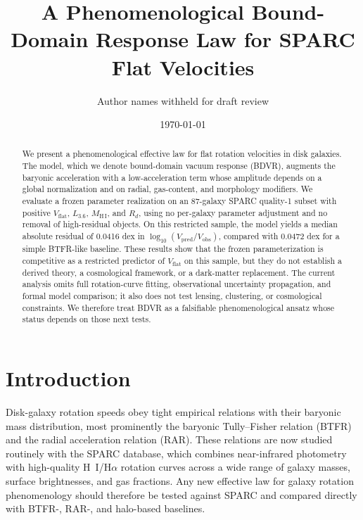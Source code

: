 \documentclass[aps,prd,preprint,nofootinbib,superscriptaddress]{revtex4-2}
\begin{document}
\title{A Phenomenological Bound-Domain Response Law for SPARC Flat Velocities}

\author{Author names withheld for draft review}

\date{\today}

\begin{abstract}
We present a phenomenological effective law for flat rotation velocities in disk galaxies. The model, which we denote bound-domain vacuum response (BDVR), augments the baryonic acceleration with a low-acceleration term whose amplitude depends on a global normalization and on radial, gas-content, and morphology modifiers. We evaluate a frozen parameter realization on an 87-galaxy SPARC quality-1 subset with positive $V_{\mathrm{flat}}$, $L_{3.6}$, $M_{\mathrm{H\,I}}$, and $R_d$, using no per-galaxy parameter adjustment and no removal of high-residual objects. On this restricted sample, the model yields a median absolute residual of 0.0416 dex in $\log_{10}(V_{\mathrm{pred}}/V_{\mathrm{obs}})$, compared with 0.0472 dex for a simple BTFR-like baseline. These results show that the frozen parameterization is competitive as a restricted predictor of $V_{\mathrm{flat}}$ on this sample, but they do not establish a derived theory, a cosmological framework, or a dark-matter replacement. The current analysis omits full rotation-curve fitting, observational uncertainty propagation, and formal model comparison; it also does not test lensing, clustering, or cosmological constraints. We therefore treat BDVR as a falsifiable phenomenological ansatz whose status depends on those next tests.
\end{abstract}

\maketitle

\section{Introduction}

Disk-galaxy rotation speeds obey tight empirical relations with their baryonic mass distribution, most prominently the baryonic Tully--Fisher relation (BTFR) and the radial acceleration relation (RAR). These relations are now studied routinely with the SPARC database, which combines near-infrared photometry with high-quality H~I/H$\alpha$ rotation curves across a wide range of galaxy masses, surface brightnesses, and gas fractions. Any new effective law for galaxy rotation phenomenology should therefore be tested against SPARC and compared directly with BTFR-, RAR-, and halo-based baselines.
\end{document}

